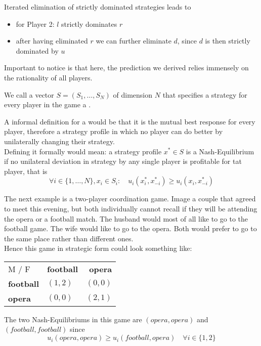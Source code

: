 \begin{example}
	Iterated elimination of strictly dominated strategies leads to
	\begin{itemize}
		\item for Player 2: $l$ strictly dominates $r$
		\item after having eliminated $r$ we can further eliminate $d$, since $d$ is then strictly dominated by $u$
	\end{itemize}
\end{example}

Important to notice is that here, the prediction we derived relies immensely on the rationality of all players.

\begin{definition} \label{strategyprofile}
	We call a vector $S = (S_{1}, \dotsc, S_{N})$ of dimension $N$ that specifies a strategy for every player in the game a .
\end{definition}

\begin{definition} \label{nashequilibrium}
	A informal definition for a  would be that it is the mutual best response for every player, therefore a strategy profile in which no player can do better by unilaterally changing their strategy. \\
	Defining it formally would mean: a strategy profile $x^{*} \in S$ is a Nash-Equilibrium if no unilateral deviation in strategy by any single player is profitable for tat player, that is
	\[ \forall i \in \{1, \dotsc, N \}, x_{i} \in S_{i}: \quad u_{i}(x_{i}^{*}, x_{-i}^{*}) \geq u_{i}(x_{i}, x_{-i}^{*}) \]
	\end{definition}

\begin{example} \label{battleofthesexes}
		The next example is a two-player coordination game. Image a couple that agreed to meet this evening, but both individually cannot recall if they will be attending the opera or a football match. The husband would most of all like to go to the football game. The wife would like to go to the opera. Both would prefer to go to the same place rather than different ones. \\
		Hence this game in strategic form could look something like:
		
		\begin{center}
			\begin{tabular}{|l|l|r|}
				\hline\hline
  					M / F & \textbf{football} & \textbf{opera} \\
         				\cline{1-3}
   					\textbf{football} & $(1, 2)$ & $(0, 0)$ 	\arrayrulewidth2pt \\
            			\cline{1-3}
   					\textbf{opera} & $(0, 0)$ & $(2, 1)$ \\ \hline\hline
			\end{tabular}	
		\end{center}
		
		The two Nash-Equilibriums in this game are $(opera, opera)$ and $(football, football)$ since
		\[ u_{i}(opera, opera) \geq u_{i}(football, opera) \quad \forall i \in \{ 1, 2 \} \]
\end{example}

